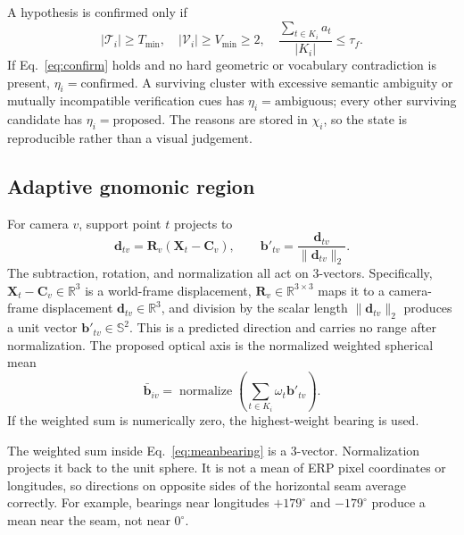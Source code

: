 \documentclass[a4paper,9pt]{extarticle}
\newcommand{\sphere}{\mathbb S^2}
\newcommand{\R}{\mathbb R}
\newcommand{\normalize}{\operatorname{normalize}}
\begin{document}
A hypothesis is confirmed only if
\begin{equation}
 |\mathcal T_i|\ge T_{\min},\quad
 |\mathcal V_i|\ge V_{\min}\ge2,\quad
 \frac{\sum_{t\in K_i}a_t}{|K_i|}\le\tau_f.
 \label{eq:confirm}
\end{equation}
If Eq.~\ref{eq:confirm} holds and no hard geometric or vocabulary contradiction is present, $\eta_i=\text{confirmed}$. A surviving cluster with excessive semantic ambiguity or mutually incompatible verification cues has $\eta_i=\text{ambiguous}$; every other surviving candidate has $\eta_i=\text{proposed}$. The reasons are stored in $\chi_i$, so the state is reproducible rather than a visual judgement.

\subsection{Adaptive gnomonic region}

For camera $v$, support point $t$ projects to
\begin{equation}
 \mathbf d_{tv}=\mathbf R_v(\mathbf X_t-\mathbf C_v),\qquad
 \mathbf b'_{tv}=\frac{\mathbf d_{tv}}{\|\mathbf d_{tv}\|_2}.
 \label{eq:project3d}
\end{equation}
The subtraction, rotation, and normalization all act on 3-vectors. Specifically,
$\mathbf X_t-\mathbf C_v\in\R^3$ is a world-frame displacement,
$\mathbf R_v\in\R^{3\times3}$ maps it to a camera-frame displacement
$\mathbf d_{tv}\in\R^3$, and division by the scalar length
$\|\mathbf d_{tv}\|_2$ produces a unit vector
$\mathbf b'_{tv}\in\sphere$. This is a predicted direction and carries no
range after normalization.
The proposed optical axis is the normalized weighted spherical mean
\begin{equation}
 \bar{\mathbf b}_{iv}=\normalize\!\left(
 \sum_{t\in K_i}\omega_t\mathbf b'_{tv}\right).
 \label{eq:meanbearing}
\end{equation}
If the weighted sum is numerically zero, the highest-weight bearing is used.

The weighted sum inside Eq.~\ref{eq:meanbearing} is a 3-vector. Normalization
projects it back to the unit sphere. It is not a mean of ERP pixel coordinates
or longitudes, so directions on opposite sides of the horizontal seam average
correctly. For example, bearings near longitudes $+179^\circ$ and
$-179^\circ$ produce a mean near the seam, not near $0^\circ$.
\end{document}
